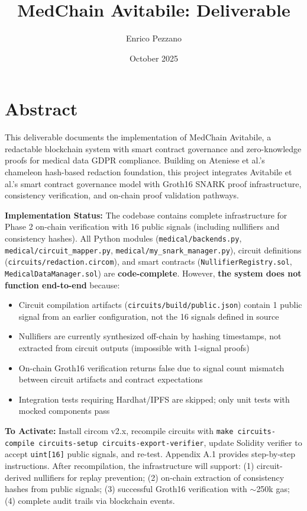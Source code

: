 \documentclass[11pt,a4paper]{article}
\title{MedChain Avitabile: Deliverable}
\author{Enrico Pezzano}
\date{October 2025}
\begin{document}
\maketitle

\section*{Abstract}

This deliverable documents the implementation of MedChain Avitabile, a redactable blockchain system with smart contract governance and zero-knowledge proofs for medical data GDPR compliance. Building on Ateniese et al.'s chameleon hash-based redaction foundation, this project integrates Avitabile et al.'s smart contract governance model with Groth16 SNARK proof infrastructure, consistency verification, and on-chain proof validation pathways.

\textbf{Implementation Status:} The codebase contains complete infrastructure for Phase 2 on-chain verification with 16 public signals (including nullifiers and consistency hashes). All Python modules (\texttt{medical/backends.py}, \texttt{medical/circuit\_mapper.py}, \texttt{medical/my\_snark\_manager.py}), circuit definitions (\texttt{circuits/redaction.circom}), and smart contracts (\texttt{NullifierRegistry.sol}, \texttt{MedicalDataManager.sol}) are \textbf{code-complete}. However, \textbf{the system does not function end-to-end} because:

\begin{itemize}
    \item Circuit compilation artifacts (\texttt{circuits/build/public.json}) contain 1 public signal from an earlier configuration, not the 16 signals defined in source
    \item Nullifiers are currently synthesized off-chain by hashing timestamps, not extracted from circuit outputs (impossible with 1-signal proofs)
    \item On-chain Groth16 verification returns false due to signal count mismatch between circuit artifacts and contract expectations
    \item Integration tests requiring Hardhat/IPFS are skipped; only unit tests with mocked components pass
\end{itemize}

\textbf{To Activate:} Install circom v2.x, recompile circuits with \texttt{make circuits-compile circuits-setup circuits-export-verifier}, update Solidity verifier to accept \texttt{uint[16]} public signals, and re-test. Appendix A.1 provides step-by-step instructions. After recompilation, the infrastructure will support: (1) circuit-derived nullifiers for replay prevention; (2) on-chain extraction of consistency hashes from public signals; (3) successful Groth16 verification with $\sim$250k gas; (4) complete audit trails via blockchain events.
\end{document}
